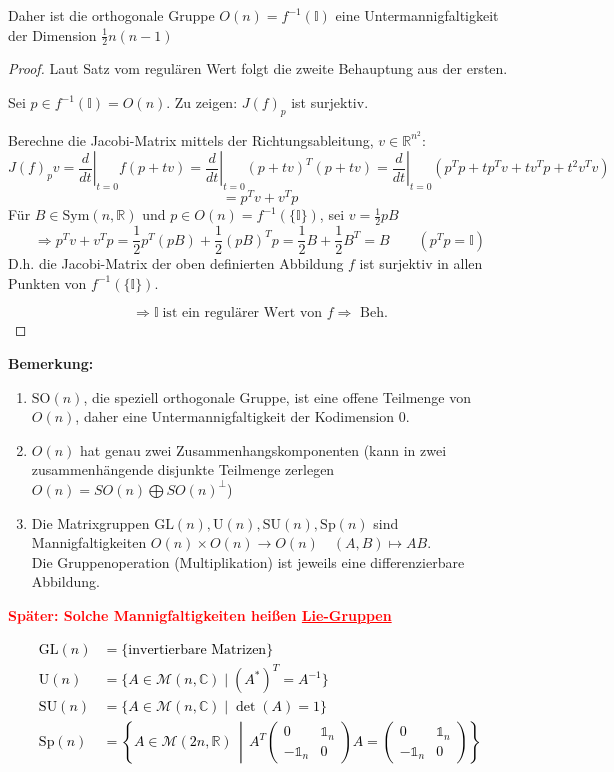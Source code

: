\documentclass[fleqn, 12pt, letterpaper]{article}
\begin{document}
Daher ist die orthogonale Gruppe \( O(n) = f^{-1}(\mathbb{I}) \) eine Untermannigfaltigkeit der Dimension $\frac{1}{2}n(n-1)$
\begin{proof}
  Laut Satz vom regulären Wert folgt die zweite Behauptung aus der ersten.

  Sei \( p \in f^{-1}(\mathbb{I}) = O(n) \). Zu zeigen: \( J(f)_p \) ist surjektiv.

  Berechne die Jacobi-Matrix mittels der Richtungsableitung, \( v \in \mathbb{R}^{n^2} \):
  \[
  J(f)_p v = \left. \frac{d}{dt} \right|_{t=0} f(p + tv) = \left. \frac{d}{dt} \right|_{t=0} \left( p+tv \right)^T \left( p+tv \right) = \left. \frac{d}{dt} \right|_{t=0} (p^Tp+tp^Tv+tv^Tp+t^2v^Tv)
  \]
  \[
  = p^Tv+v^Tp
  \]
  Für \( B \in \mathrm{Sym}(n, \mathbb{R}) \) und \( p \in O(n) = f^{-1}(\{\mathbb{I}\}) \), sei \( v = \frac{1}{2}pB\)
  \[
  \Rightarrow p^Tv+v^Tp=\frac{1}{2}p^T(pB)+\frac{1}{2}(pB)^Tp=\frac{1}{2}B+\frac{1}{2}B^T=B \qquad (p^Tp=\mathbb{I})
  \]
  D.h. die Jacobi-Matrix der oben definierten Abbildung \( f \) ist surjektiv in allen Punkten von \( f^{-1}(\{\mathbb{I}\}) \).

  \[
  \Rightarrow \mathbb{I} \;\text{ist ein regulärer Wert von } f \Rightarrow \text{ Beh.}
  \]
\end{proof}
\textbf{Bemerkung:}
\begin{enumerate}
  \item \( \mathrm{SO}(n) \), die speziell orthogonale Gruppe, ist eine offene Teilmenge von \( O(n) \), daher eine Untermannigfaltigkeit der Kodimension 0.
  \item \( O(n) \) hat genau zwei Zusammenhangskomponenten (kann in zwei zusammenhängende disjunkte Teilmenge zerlegen $O(n)=SO(n)\bigoplus SO(n)^{\bot}$)
  \item Die Matrixgruppen \( \mathrm{GL}(n), \mathrm{U}(n), \mathrm{SU}(n), \mathrm{Sp}(n) \) sind Mannigfaltigkeiten $O(n)\times O(n)\to O(n) \quad (A,B)\mapsto AB$.\\
  Die Gruppenoperation (Multiplikation) ist jeweils eine differenzierbare Abbildung.
\end{enumerate}
\textcolor{red}{\textbf{Später: Solche Mannigfaltigkeiten heißen \underline{Lie-Gruppen}}}

\textcolor{black}{
\begin{align*}
\mathrm{GL}(n) &= \{ \text{invertierbare Matrizen} \} \\
\mathrm{U}(n) &= \{ A \in \mathcal{M}(n, \mathbb{C}) \mid (A^*)^T = A^{-1} \} \\
\mathrm{SU}(n) &= \{ A \in \mathcal{M}(n, \mathbb{C}) \mid \det(A) = 1 \} \\
\mathrm{Sp}(n) &= \left\{ A \in \mathcal{M}(2n, \mathbb{R}) \,\middle|\, A^T 
\begin{pmatrix}
0 & \mathbb{1}_n \\
-\mathbb{1}_n & 0
\end{pmatrix}
A =
\begin{pmatrix}
0 & \mathbb{1}_n \\
-\mathbb{1}_n & 0
\end{pmatrix}
\right\}
\end{align*}
}
\end{document}
